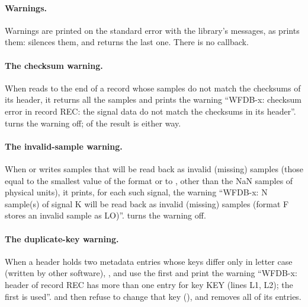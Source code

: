 \paragraph{Warnings.} Warnings are printed on the standard error with the library's
messages, as  prints them:  silences them, and
 returns the last one. There is no callback.

\paragraph{The checksum warning.} When  reads to the end of a record
whose samples do not match the checksums of its header, it returns all the samples and
prints the warning ``WFDB-x: checksum error in record REC: the signal data do not match
the checksums in its header''.  turns the warning off;
 of the result is  either way.

\paragraph{The invalid-sample warning.} When  or
 writes samples that will be read back as invalid
(missing) samples (those equal to the smallest value of the format or to
, other than the NaN samples of physical units), it prints,
for each such signal, the warning ``WFDB-x: N sample(s) of signal K will be read back as
invalid (missing) samples (format F stores an invalid sample as LO)''.
 turns the warning off.

\paragraph{The duplicate-key warning.} When a header holds two metadata entries whose keys
differ only in letter case (written by other software), ,
 and  use the first and print the warning ``WFDB-x:
header of record REC has more than one entry for key KEY (lines L1, L2); the first is
used''.  and  then refuse to change that key
(), and  removes all of its entries.

